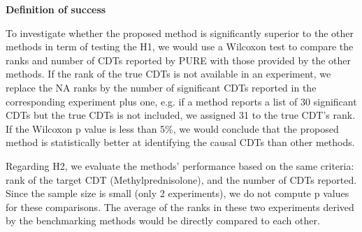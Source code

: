%


\textbf{Definition of success}

To investigate whether the proposed method  is significantly superior to the other methods in term of testing the H1, we would use a Wilcoxon test to compare the ranks and number of CDTs reported by PURE with those provided by the  other methods. 
If the rank of the true CDTs is not available in an experiment, we replace the NA ranks by the number of significant CDTs reported in the corresponding experiment plus one, 
e.g. if a method reports a list of 30 significant CDTs but the true CDTs is not included, we assigned 31 to the true CDT's rank.
If the Wilcoxon p value is less than 5\%, we would conclude that the proposed method is statistically better at identifying the causal CDTs than other methods.

Regarding H2, we evaluate the methods' performance based on the same criteria: rank of the target CDT (Methylprednisolone), and the number of CDTs reported. 
Since the sample size is small (only 2 experiments), we do not compute p values for these comparisons. The average of the ranks in these two experiments derived by the benchmarking methods would be directly compared to each other.

